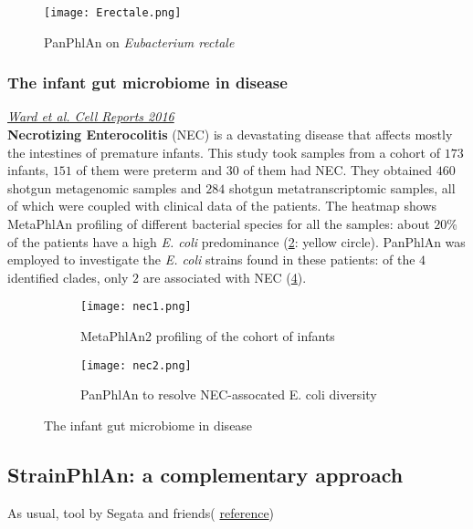 \begin{figure}[!h]
\centering
\texttt{[image: Erectale.png]}
\caption{\label{fig:Erec} PanPhlAn on \emph{Eubacterium rectale}}
\end{figure}

\subsubsection{The infant gut microbiome in disease}

\href{https://www.cell.com/cell-reports/pdf/S2211-1247(16)30256-X.pdf}{\emph{Ward et al. Cell Reports 2016}} \\

\textbf{Necrotizing Enterocolitis} (NEC) is a devastating disease that affects mostly the intestines of premature infants. This study took samples from a cohort of $173$ infants, $151$ of them were preterm and $30$ of them had NEC. They obtained $460$ shotgun metagenomic samples and $284$ shotgun metatranscriptomic samples, all of which were coupled with clinical data of the patients. The heatmap shows MetaPhlAn profiling of different bacterial species for all the samples: about $20$\% of the patients have a high \emph{E. coli} predominance (\ref{fig:nec1}: yellow circle). PanPhlAn was employed to investigate the \emph{E. coli} strains found in these patients: of the $4$ identified clades, only $2$ are associated with NEC (\ref{fig:nec2}).

\begin{figure}[!h]
\centering
\begin{subfigure}{.45\textwidth}
    \centering
    \texttt{[image: nec1.png]}
    \caption{\label{fig:nec1}MetaPhlAn2 profiling of the cohort of infants}
\end{subfigure}
%
\begin{subfigure}{.45\textwidth}
    \centering
    \texttt{[image: nec2.png]}
    \caption{\label{fig:nec2}PanPhlAn to resolve NEC-assocated E. coli diversity}
\end{subfigure}
\caption{The infant gut microbiome in disease}
\end{figure}

\subsection{StrainPhlAn: a complementary approach}

As usual, tool by Segata and friends( \href{http://segatalab.cibio.unitn.it/tools/strainphlan/index.html}{reference}) \\

